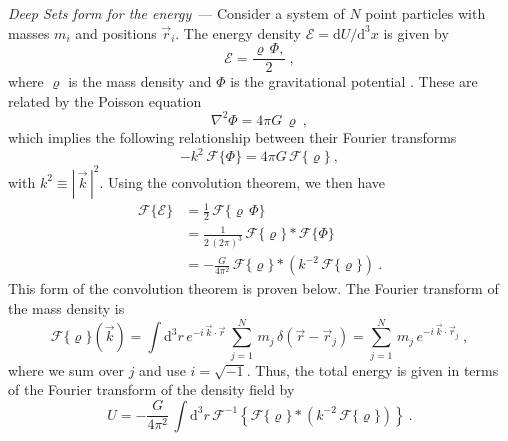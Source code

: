 \documentclass[10pt]{article}
\renewcommand{\paragraph}[1]{\par\addvspace{1em}\noindent\textsl{#1}~---}
\renewcommand{\d}{\mathrm{d}}
\newcommand{\abs}[1]{|\,{#1}\,|}
\begin{document}
\paragraph{Deep Sets form for the energy} Consider a system of $N$ point particles with masses $m_i$ and positions $\vec{r}_i$.
The energy density $\mathcal{E} = \d U / \d^3 x$ is given by
\begin{equation}
    \mathcal{E} = \frac{\varrho \, \Phi,}{2}~,
\end{equation}
where $\varrho$ is the mass density and $\Phi$ is the gravitational potential \citep{LandauLifshitzFields}.
These are related by the Poisson equation
\begin{equation}
    \nabla^2 \Phi = 4 \pi G \, \varrho~,
\end{equation}
which implies the following relationship between their Fourier transforms
\begin{equation}
    -k^2 \, \mathcal{F}\{\Phi\} = 4 \pi G \, \mathcal{F}\{\varrho\}~,
\end{equation}
with $k^2 \equiv \abs{\vec{k}}^2$.
Using the convolution theorem, we then have
\begin{align}
    \mathcal{F}\{\mathcal{E}\}
    &= \frac{1}{2} \, \mathcal{F}\{\varrho \, \Phi\} \nonumber\\
    &= \frac{1}{2 \, (2\pi)^3} \, \mathcal{F}\{\varrho\} \ast \mathcal{F}\{\Phi\} \nonumber\\
    &= -\frac{G}{4\pi^2} \, \mathcal{F}\{\varrho\} \ast \left( k^{-2} \, \mathcal{F}\{\varrho\} \right)~.
    \label{eq:ConvolutionThm}
\end{align}
This form of the convolution theorem is proven below.
The Fourier transform of the mass density is
\begin{equation}
    \mathcal{F}\{\varrho\}(\vec{k})
    = \int \d^3 r
        \, e^{-i \, \vec{k} \cdot \vec{r}}
        \, \sum_{j=1}^{N}
        \, m_j
        \, \delta(\vec{r} - \vec{r}_j)
    = \sum_{j=1}^{N} \, m_j \, e^{-i \, \vec{k} \cdot \vec{r}_j}~,
\end{equation}
where we sum over $j$ and use $i=\sqrt{-1}$.
Thus, the total energy is given in terms of the Fourier transform of the density field by
\begin{equation}
    U 
    = -\frac{G}{4 \pi^2} \,
        \int \d^3 r \,
        \mathcal{F}^{-1} \! \left\{
            \mathcal{F}\{\varrho\} \ast \left(
            k^{-2} \, \mathcal{F}\{\varrho\} \right)
        \right\}~.
\end{equation}
\end{document}
